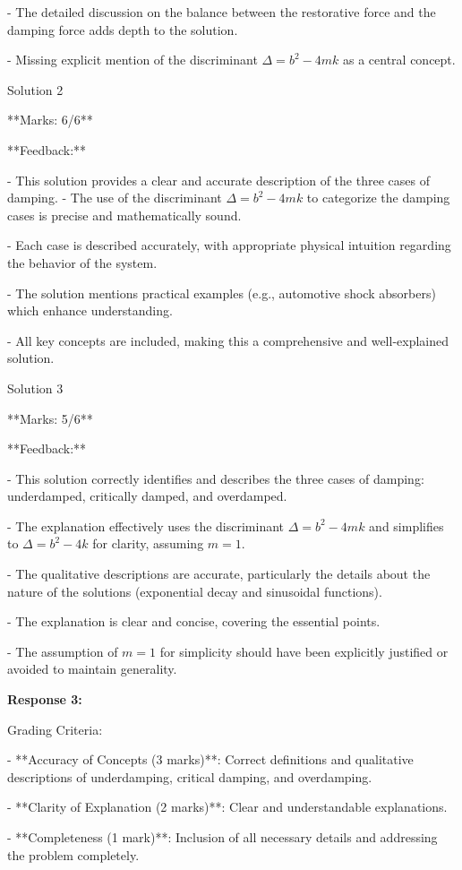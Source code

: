 \documentclass[a4paper,11pt]{article}
\begin{document}
- The detailed discussion on the balance between the restorative force and the damping force adds depth to the solution.

- Missing explicit mention of the discriminant \(\Delta = b^2 - 4mk\) as a central concept.

Solution 2

**Marks: 6/6**

**Feedback:**

- This solution provides a clear and accurate description of the three cases of damping.
- The use of the discriminant \(\Delta = b^2 - 4mk\) to categorize the damping cases is precise and mathematically sound.

- Each case is described accurately, with appropriate physical intuition regarding the behavior of the system.

- The solution mentions practical examples (e.g., automotive shock absorbers) which enhance understanding.

- All key concepts are included, making this a comprehensive and well-explained solution.

Solution 3

**Marks: 5/6**

**Feedback:**

- This solution correctly identifies and describes the three cases of damping: underdamped, critically damped, and overdamped.

- The explanation effectively uses the discriminant \(\Delta = b^2 - 4mk\) and simplifies to \(\Delta = b^2 - 4k\) for clarity, assuming \(m=1\).

- The qualitative descriptions are accurate, particularly the details about the nature of the solutions (exponential decay and sinusoidal functions).

- The explanation is clear and concise, covering the essential points.

- The assumption of \(m=1\) for simplicity should have been explicitly justified or avoided to maintain generality.

\bigskip
\textbf{Response 3:}

Grading Criteria:

- **Accuracy of Concepts (3 marks)**: Correct definitions and qualitative descriptions of underdamping, critical damping, and overdamping.

- **Clarity of Explanation (2 marks)**: Clear and understandable explanations.

- **Completeness (1 mark)**: Inclusion of all necessary details and addressing the problem completely.
\end{document}
